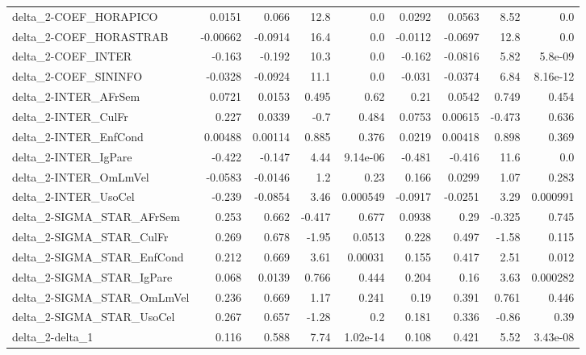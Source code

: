 \begin{tabular}{lrrrrrrrr}
delta\_2-COEF\_HORAPICO                 &      0.0151 &        0.066 &     12.8 &      0.0 &     0.0292 &      0.0563 &         8.52 &           0.0 \\
delta\_2-COEF\_HORASTRAB                &    -0.00662 &      -0.0914 &     16.4 &      0.0 &    -0.0112 &     -0.0697 &         12.8 &           0.0 \\
delta\_2-COEF\_INTER                    &      -0.163 &       -0.192 &     10.3 &      0.0 &     -0.162 &     -0.0816 &         5.82 &       5.8e-09 \\
delta\_2-COEF\_SININFO                  &     -0.0328 &      -0.0924 &     11.1 &      0.0 &     -0.031 &     -0.0374 &         6.84 &      8.16e-12 \\
delta\_2-INTER\_AFrSem                  &      0.0721 &       0.0153 &    0.495 &     0.62 &       0.21 &      0.0542 &        0.749 &         0.454 \\
delta\_2-INTER\_CulFr                   &       0.227 &       0.0339 &     -0.7 &    0.484 &     0.0753 &     0.00615 &       -0.473 &         0.636 \\
delta\_2-INTER\_EnfCond                 &     0.00488 &      0.00114 &    0.885 &    0.376 &     0.0219 &     0.00418 &        0.898 &         0.369 \\
delta\_2-INTER\_IgPare                  &      -0.422 &       -0.147 &     4.44 & 9.14e-06 &     -0.481 &      -0.416 &         11.6 &           0.0 \\
delta\_2-INTER\_OmLmVel                 &     -0.0583 &      -0.0146 &      1.2 &     0.23 &      0.166 &      0.0299 &         1.07 &         0.283 \\
delta\_2-INTER\_UsoCel                  &      -0.239 &      -0.0854 &     3.46 & 0.000549 &    -0.0917 &     -0.0251 &         3.29 &      0.000991 \\
delta\_2-SIGMA\_STAR\_AFrSem             &       0.253 &        0.662 &   -0.417 &    0.677 &     0.0938 &        0.29 &       -0.325 &         0.745 \\
delta\_2-SIGMA\_STAR\_CulFr              &       0.269 &        0.678 &    -1.95 &   0.0513 &      0.228 &       0.497 &        -1.58 &         0.115 \\
delta\_2-SIGMA\_STAR\_EnfCond            &       0.212 &        0.669 &     3.61 &  0.00031 &      0.155 &       0.417 &         2.51 &         0.012 \\
delta\_2-SIGMA\_STAR\_IgPare             &       0.068 &       0.0139 &    0.766 &    0.444 &      0.204 &        0.16 &         3.63 &      0.000282 \\
delta\_2-SIGMA\_STAR\_OmLmVel            &       0.236 &        0.669 &     1.17 &    0.241 &       0.19 &       0.391 &        0.761 &         0.446 \\
delta\_2-SIGMA\_STAR\_UsoCel             &       0.267 &        0.657 &    -1.28 &      0.2 &      0.181 &       0.336 &        -0.86 &          0.39 \\
delta\_2-delta\_1                       &       0.116 &        0.588 &     7.74 & 1.02e-14 &      0.108 &       0.421 &         5.52 &      3.43e-08 \\
\bottomrule
\end{tabular}
